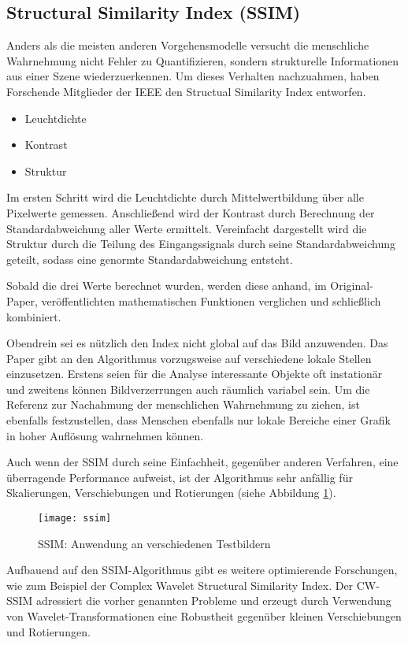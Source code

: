 \subsection{Structural Similarity Index (SSIM)}
Anders als die meisten anderen Vorgehensmodelle versucht die menschliche
Wahrnehmung nicht Fehler zu Quantifizieren, sondern strukturelle Informationen
aus einer Szene wiederzuerkennen. Um dieses Verhalten nachzuahmen, haben
Forschende Mitglieder der IEEE den Structual Similarity Index entworfen.
\parencite{ssim-orig-paper}

\begin{itemize}[topsep=0pt]
    \item Leuchtdichte
    \item Kontrast
    \item Struktur
\end{itemize}

Im ersten Schritt wird die Leuchtdichte durch Mittelwertbildung über alle
Pixelwerte gemessen. Anschließend wird der Kontrast durch Berechnung der
Standardabweichung aller Werte ermittelt. Vereinfacht dargestellt wird die
Struktur durch die Teilung des Eingangssignals durch seine Standardabweichung
geteilt, sodass eine genormte Standardabweichung entsteht.
\parencite{ssim-summary}

Sobald die drei Werte berechnet wurden, werden diese anhand, im Original-Paper,
veröffentlichten mathematischen Funktionen verglichen und schließlich
kombiniert. \parencite{ssim-summary}

Obendrein sei es nützlich den Index nicht global auf das Bild anzuwenden. Das
Paper gibt an den Algorithmus vorzugsweise auf verschiedene lokale Stellen
einzusetzen. Erstens seien für die Analyse interessante Objekte oft instationär
und zweitens können Bildverzerrungen auch räumlich variabel sein. Um die
Referenz zur Nachahmung der menschlichen Wahrnehmung zu ziehen, ist ebenfalls
festzustellen, dass Menschen ebenfalls nur lokale Bereiche einer Grafik in hoher
Auflösung wahrnehmen können. \parencite{ssim-summary}

Auch wenn der SSIM durch seine Einfachheit, gegenüber anderen Verfahren, eine
überragende Performance aufweist, ist der Algorithmus sehr anfällig für
Skalierungen, Verschiebungen und Rotierungen (siehe Abbildung \ref{fig:ssim}).
\parencite{ssim-quality-assessment}

\begin{figure}[H]
    \centering
    \texttt{[image: ssim]}
    \caption{SSIM: Anwendung an verschiedenen Testbildern}
    \label{fig:ssim}
\end{figure}


Aufbauend auf den SSIM-Algorithmus gibt es weitere optimierende Forschungen, wie
zum Beispiel der Complex Wavelet Structural Similarity Index. Der CW-SSIM
adressiert die vorher genannten Probleme und erzeugt durch Verwendung von
Wavelet-Transformationen eine Robustheit gegenüber kleinen Verschiebungen und
Rotierungen. \parencite{ssim-complex-wavelet}
